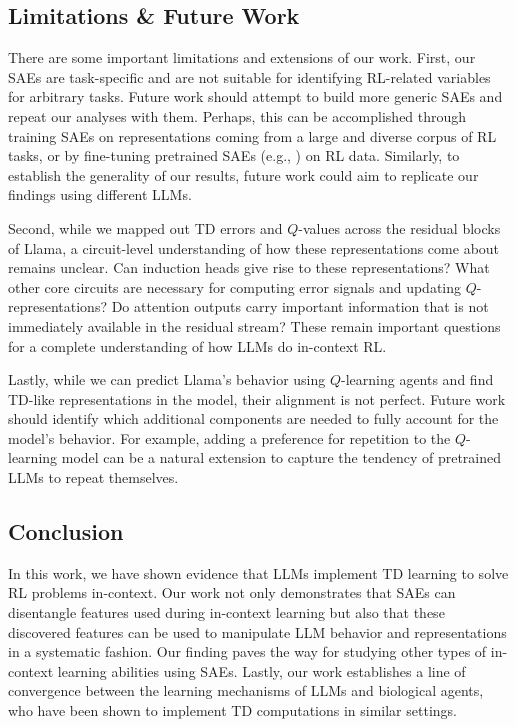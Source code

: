 \documentclass{article} %
\begin{document}
\subsection{Limitations \& Future Work}

There are some important limitations and extensions of our work. First, our SAEs are task-specific and are not suitable for identifying RL-related variables for arbitrary tasks. Future work should attempt to build more generic SAEs and repeat our analyses with them. Perhaps, this can be accomplished through training SAEs on representations coming from a large and diverse corpus of RL tasks, or by fine-tuning pretrained SAEs (e.g., \citet{lieberum2024gemma}) on RL data. Similarly, to establish the generality of our results, future work could aim to replicate our findings using different LLMs.

Second, while we mapped out TD errors and $Q$-values across the residual blocks of Llama, a circuit-level understanding of how these representations come about remains unclear. Can induction heads \citep{olsson2022context} give rise to these representations? What other core circuits are necessary for computing error signals and updating $Q$-representations? Do attention outputs carry important information that is not immediately available in the residual stream? These remain important questions for a complete understanding of how LLMs do in-context RL.

Lastly, while we can predict Llama's behavior using $Q$-learning agents and find TD-like representations in the model, their alignment is not perfect. Future work should identify which additional components are needed to fully account for the model's behavior. For example, adding a preference for repetition to the $Q$-learning model can be a natural extension to capture the tendency of pretrained LLMs to repeat themselves. 


\subsection{Conclusion}
In this work, we have shown evidence that LLMs implement TD learning to solve RL problems in-context. Our work not only demonstrates that SAEs can disentangle features used during in-context learning but also that these discovered features can be used to manipulate LLM behavior and representations in a systematic fashion. Our finding paves the way for studying other types of in-context learning abilities using SAEs. Lastly, our work establishes a line of convergence between the learning mechanisms of LLMs and biological agents, who have been shown to implement TD computations in similar settings.
\end{document}
